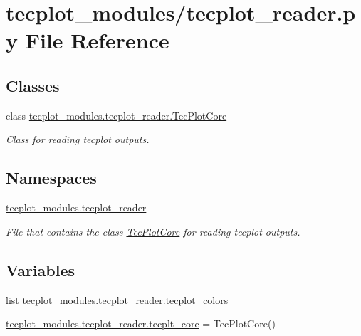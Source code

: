 \hypertarget{a00041}{}\section{tecplot\+\_\+modules/tecplot\+\_\+reader.py File Reference}
\label{a00041}
\subsection*{Classes}
\begin{DoxyCompactItemize}
\item 
class \hyperlink{a00118}{tecplot\+\_\+modules.\+tecplot\+\_\+reader.\+Tec\+Plot\+Core}
\begin{DoxyCompactList}\small\item\em Class for reading tecplot outputs. \end{DoxyCompactList}\end{DoxyCompactItemize}
\subsection*{Namespaces}
\begin{DoxyCompactItemize}
\item 
 \hyperlink{a00065}{tecplot\+\_\+modules.\+tecplot\+\_\+reader}
\begin{DoxyCompactList}\small\item\em File that contains the class \hyperlink{a00118}{Tec\+Plot\+Core} for reading tecplot outputs. \end{DoxyCompactList}\end{DoxyCompactItemize}
\subsection*{Variables}
\begin{DoxyCompactItemize}
\item 
list \hyperlink{a00065_a1e797fe85a325b8a8f10b118db5c9a47}{tecplot\+\_\+modules.\+tecplot\+\_\+reader.\+tecplot\+\_\+colors}
\item 
\hyperlink{a00065_a451a17322511f6ada93a0d61c5aa34c9}{tecplot\+\_\+modules.\+tecplot\+\_\+reader.\+tecplt\+\_\+core} = Tec\+Plot\+Core()
\end{DoxyCompactItemize}
